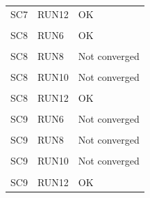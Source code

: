 \documentclass[
  12pt,
]{article}
\begin{document}
\begin{table}[!h]
\begin{tabular}[t]{lll}
SC7 & RUN12 & OK\\
\cellcolor{gray!10}{SC8} & \cellcolor{gray!10}{RUN5} & \cellcolor{gray!10}{Not converged}\\
\addlinespace
SC8 & RUN6 & OK\\
\cellcolor{gray!10}{SC8} & \cellcolor{gray!10}{RUN7} & \cellcolor{gray!10}{Not converged}\\
SC8 & RUN8 & Not converged\\
\cellcolor{gray!10}{SC8} & \cellcolor{gray!10}{RUN9} & \cellcolor{gray!10}{OK}\\
SC8 & RUN10 & Not converged\\
\addlinespace
\cellcolor{gray!10}{SC8} & \cellcolor{gray!10}{RUN11} & \cellcolor{gray!10}{OK}\\
SC8 & RUN12 & OK\\
\cellcolor{gray!10}{SC9} & \cellcolor{gray!10}{RUN5} & \cellcolor{gray!10}{Not converged}\\
SC9 & RUN6 & Not converged\\
\cellcolor{gray!10}{SC9} & \cellcolor{gray!10}{RUN7} & \cellcolor{gray!10}{Not converged}\\
\addlinespace
SC9 & RUN8 & Not converged\\
\cellcolor{gray!10}{SC9} & \cellcolor{gray!10}{RUN9} & \cellcolor{gray!10}{OK}\\
SC9 & RUN10 & Not converged\\
\cellcolor{gray!10}{SC9} & \cellcolor{gray!10}{RUN11} & \cellcolor{gray!10}{OK}\\
SC9 & RUN12 & OK\\
\bottomrule
\end{tabular}
\end{table}
\end{document}
